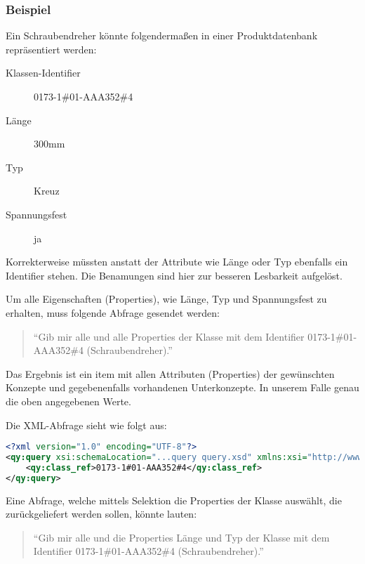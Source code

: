 \subsubsection{Beispiel}\label{lab:schraubendreher}

Ein Schraubendreher könnte folgendermaßen in einer Produktdatenbank repräsentiert werden:

\begin{description}
\item[Klassen-Identifier] 0173-1\#01-AAA352\#4 
\item[Länge] 300mm
\item[Typ] Kreuz
\item[Spannungsfest] ja
\end{description}

Korrekterweise müssten anstatt der Attribute wie Länge oder Typ ebenfalls ein Identifier stehen. Die Benamungen sind hier zur besseren Lesbarkeit aufgelöst. 

Um alle Eigenschaften (Properties), wie Länge, Typ und Spannungsfest zu erhalten, muss folgende Abfrage gesendet werden: 
\begin{quotation}
\enquote{Gib mir alle  und alle Properties der Klasse mit dem Identifier 0173-1\#01-AAA352\#4 (Schraubendreher).}
\end{quotation}

Das Ergebnis ist ein \gls{item} mit allen Attributen (Properties) der gewünschten Konzepte und gegebenenfalls vorhandenen Unterkonzepte. In unserem Falle genau die oben angegebenen Werte.

Die XML-Abfrage sieht wie folgt aus:

\begin{lstlisting}[caption=Query Beispiel - Daten abfragen, language=XML, label=UseCaseDatenabfragen]
<?xml version="1.0" encoding="UTF-8"?>
<qy:query xsi:schemaLocation="...query query.xsd" xmlns:xsi="http://www.w3.org/2001/XMLSchema-instance" xmlns:cat="...catalogue" xmlns:val="...value" xmlns:qy="...query" xmlns:bas="...basic">
	<qy:class_ref>0173-1#01-AAA352#4</qy:class_ref>
</qy:query>
\end{lstlisting}

Eine Abfrage, welche mittels Selektion die Properties der Klasse auswählt, die zurückgeliefert werden sollen, könnte lauten: 
\begin{quotation}
\enquote{Gib mir alle  und die Properties Länge und Typ der Klasse mit dem Identifier 0173-1\#01-AAA352\#4 (Schraubendreher).}
\end{quotation}

